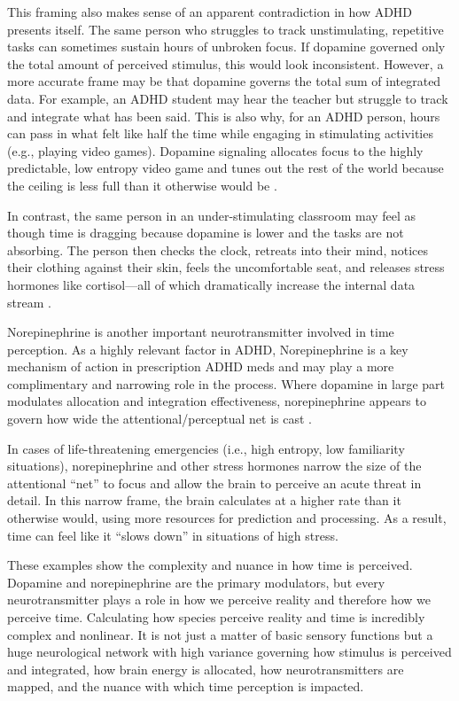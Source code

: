 \documentclass[11pt,a4paper]{article}
\begin{document}
This framing also makes sense of an apparent contradiction in how ADHD presents itself. The same person who struggles to track unstimulating, repetitive tasks can sometimes sustain hours of unbroken focus. If dopamine governed only the total amount of perceived stimulus, this would look inconsistent. However, a more accurate frame may be that dopamine governs the total sum of integrated data. For example, an ADHD student may hear the teacher but struggle to track and integrate what has been said. This is also why, for an ADHD person, hours can pass in what felt like half the time while engaging in stimulating activities (e.g., playing video games). Dopamine signaling allocates focus to the highly predictable, low entropy video game and tunes out the rest of the world because the ceiling is less full than it otherwise would be \citep{qiu2018rapid}.

In contrast, the same person in an under-stimulating classroom may feel as though time is dragging because dopamine is lower and the tasks are not absorbing. The person then checks the clock, retreats into their mind, notices their clothing against their skin, feels the uncomfortable seat, and releases stress hormones like cortisol—all of which dramatically increase the internal data stream \citep{henckens2009}.

Norepinephrine is another important neurotransmitter involved in time perception. As a highly relevant factor in ADHD, Norepinephrine is a key mechanism of action in prescription ADHD meds and may play a more complimentary and narrowing role in the process. Where dopamine in large part modulates allocation and integration effectiveness, norepinephrine appears to govern how wide the attentional/perceptual net is cast \citep{ghosh2024locus}.

In cases of life-threatening emergencies (i.e., high entropy, low familiarity situations), norepinephrine and other stress hormones narrow the size of the attentional “net” to focus and allow the brain to perceive an acute threat in detail. In this narrow frame, the brain calculates at a higher rate than it otherwise would, using more resources for prediction and processing. As a result, time can feel like it “slows down” in situations of high stress.

These examples show the complexity and nuance in how time is perceived. Dopamine and norepinephrine are the primary modulators, but every neurotransmitter plays a role in how we perceive reality and therefore how we perceive time. Calculating how species perceive reality and time is incredibly complex and nonlinear. It is not just a matter of basic sensory functions but a huge neurological network with high variance governing how stimulus is perceived and integrated, how brain energy is allocated, how neurotransmitters are mapped, and the nuance with which time perception is impacted.
\end{document}
